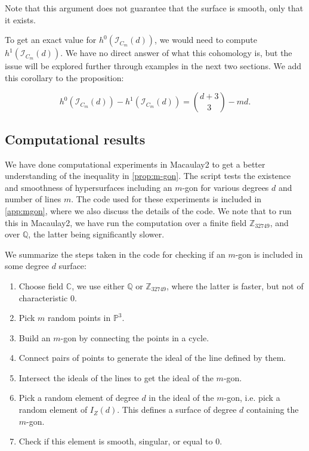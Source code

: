 \begin{remark}
    Note that this argument does not guarantee that the surface is smooth, only that it exists.
\end{remark}

To get an exact value for $h^0(\mathcal{I}_{C_m}(d))$, we would need to compute $h^1(\mathcal{I}_{C_m}(d))$. We have no direct answer of what this cohomology is, but the issue will be explored further through examples in the next two sections. We add this corollary to the proposition:

\begin{corollary} \label{cor:h0-h1}
    \[h^0(\mathcal{I}_{C_m}(d)) - h^1(\mathcal{I}_{C_m}(d)) = \binom{d+3}{3} - md.\]
\end{corollary}

\subsection{Computational results}
We have done computational experiments in Macaulay2 to get a better understanding of the inequality in \cref{prop:m-gon}. The script tests the existence and smoothness of hypersurfaces including an $m$-gon for various degrees $d$ and number of lines $m$. The code used for these experiments is included in \cref{app:mgon}, where we also discuss the details of the code. We note that to run this in Macaulay2, we have run the computation over a finite field $\mathbb{Z}_{32749}$, and over $\mathbb{Q}$, the latter being significantly slower.

We summarize the steps taken in the code for checking if an $m$-gon is included in some degree $d$ surface:
\begin{enumerate}
    \item Choose field $\mathbb{C}$, we use either $\mathbb{Q}$ or $\mathbb{Z}_{32749}$, where the latter is faster, but not of characteristic 0.
    \item Pick $m$ random points in $\mathbb{P}^3$.
    \item Build an $m$-gon by connecting the points in a cycle.
    \item Connect pairs of points to generate the ideal of the line defined by them.
    \item Intersect the ideals of the lines to get the ideal of the $m$-gon.
    \item Pick a random element of degree $d$ in the ideal of the $m$-gon, i.e. pick a random element of $I_Z(d)$. This defines a surface of degree $d$ containing the $m$-gon.
    \item Check if this element is smooth, singular, or equal to 0.
\end{enumerate}

